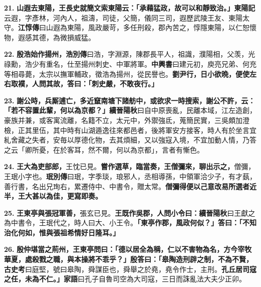 \textbf{21.} \textbf{山遐去東陽，王長史就簡文索東陽云：「承藉猛政，故可以和靜致治。」}{\footnotesize \textbf{東陽記}云遐，字彥林，河內人，祖濤，司徒，父簡，儀同三司，遐歷武陵王友、東陽太守。\textbf{江惇傳}曰山遐為東陽，風政嚴苛，多任刑殺，郡內苦之，惇隱東陽，以仁恕懷物，遐感其德，為微損威猛。}

\textbf{22.} \textbf{殷浩始作揚州，}{\footnotesize \textbf{浩別傳}曰浩，字淵源，陳郡長平人，祖識，濮陽相，父羡，光祿勳，浩少有重名，仕至揚州刺史、中軍將軍。\textbf{中興書}曰建元初，庾亮兄弟、何充等相尋薨，太宗以撫軍輔政，徵浩為揚州，從民譽也。}\textbf{劉尹行，日小欲晩，便使左右取襆，人問其故，答曰：「刺史嚴，不敢夜行。」}

\textbf{23.} \textbf{謝公時，兵厮逋亡，多近竄南塘下諸舫中，或欲求一時搜索，謝公不許，云：「若不容置此輩，何以為京都？」}{\footnotesize \textbf{續晉陽秋}曰自中原喪亂，民離本域，江左造創，豪族并兼，或客寓流離，名籍不立，太元中，外禦強氐，蒐簡民實，三吳頗加澄檢，正其里伍，其中時有山湖遁逸往來都邑者，後將軍安方接客，時人有於坐言宜糺舍藏之失者，安毎以厚德化物，去其煩細，又以強寇入境，不宜加動人情，乃答之云「卿所憂，在於客耳，然不爾，何以為京都」，言者有慚色。}

\textbf{24.} \textbf{王大為吏部郎，}{\footnotesize 王忱已見。}\textbf{嘗作選草，臨當奏，王僧彌來，聊出示之，}{\footnotesize 僧彌，王珉小字也。\textbf{珉別傳}曰珉，字季琰，琅邪人，丞相導孫，中領軍洽少子，有才蓺，善行書，名出兄珣右，累遷侍中、中書令，贈太常。}\textbf{僧彌得便以己意改易所選者近半，王大甚以為佳，更寫即奏。}

\textbf{25.} \textbf{王東亭與張冠軍善，}{\footnotesize 張玄已見。}\textbf{王既作吳郡，人問小令曰：}{\footnotesize \textbf{續晉陽秋}曰王獻之為中書令，王珉代之，時人曰大、小王令。}\textbf{「東亭作郡，風政何似？」答曰：「不知治化何如，惟與張祖希情好日隆耳。」}

\textbf{26.} \textbf{殷仲堪當之荊州，王東亭問曰：「德以居全為稱，仁以不害物為名，方今宰牧華夏，處殺戮之職，與本操將不乖乎？」殷答曰：「皋陶造刑辟之制，不為不賢，}{\footnotesize \textbf{古史考}曰庭堅，號曰皋陶，舜謀臣也，舜舉之於堯，堯令作士，主刑。}\textbf{孔丘居司寇之任，未為不仁。」}{\footnotesize \textbf{家語}曰孔子自魯司空為大司寇，三日而誅亂法大夫少正卯。}